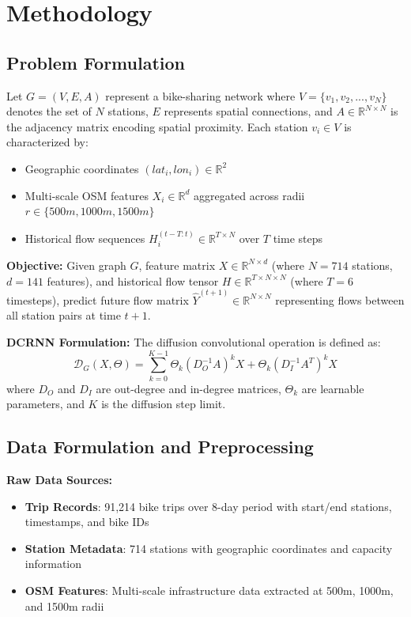 \documentclass[twocolumn,11pt]{IEEEtran}
\begin{document}
\section{Methodology}

\subsection{Problem Formulation}

Let $G = (V, E, A)$ represent a bike-sharing network where $V = \{v_1, v_2, ..., v_N\}$ denotes the set of $N$ stations, $E$ represents spatial connections, and $A \in \mathbb{R}^{N \times N}$ is the adjacency matrix encoding spatial proximity. Each station $v_i \in V$ is characterized by:
\begin{itemize}
\item Geographic coordinates $(lat_i, lon_i) \in \mathbb{R}^2$
\item Multi-scale OSM features $X_i \in \mathbb{R}^d$ aggregated across radii $r \in \{500m, 1000m, 1500m\}$
\item Historical flow sequences $H_i^{(t-T:t)} \in \mathbb{R}^{T \times N}$ over $T$ time steps
\end{itemize}

\textbf{Objective:} Given graph $G$, feature matrix $X \in \mathbb{R}^{N \times d}$ (where $N=714$ stations, $d=141$ features), and historical flow tensor $H \in \mathbb{R}^{T \times N \times N}$ (where $T=6$ timesteps), predict future flow matrix $\hat{Y}^{(t+1)} \in \mathbb{R}^{N \times N}$ representing flows between all station pairs at time $t+1$.

\textbf{DCRNN Formulation:} The diffusion convolutional operation is defined as:
\begin{equation}
\mathcal{D}_G(X, \Theta) = \sum_{k=0}^{K-1} \Theta_k (D_O^{-1}A)^k X + \Theta_k (D_I^{-1}A^T)^k X
\end{equation}
where $D_O$ and $D_I$ are out-degree and in-degree matrices, $\Theta_k$ are learnable parameters, and $K$ is the diffusion step limit.

\subsection{Data Formulation and Preprocessing}

\textbf{Raw Data Sources:}
\begin{itemize}
\item \textbf{Trip Records}: 91,214 bike trips over 8-day period with start/end stations, timestamps, and bike IDs
\item \textbf{Station Metadata}: 714 stations with geographic coordinates and capacity information
\item \textbf{OSM Features}: Multi-scale infrastructure data extracted at 500m, 1000m, and 1500m radii
\end{itemize}
\end{document}
